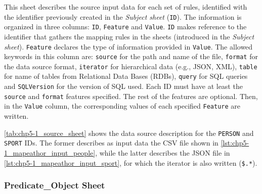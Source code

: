 This sheet describes the source input data for each set of rules, identified with the identifier previously created in the \textit{Subject sheet} (\texttt{ID}). The information is organized in three columns: \texttt{ID}, \texttt{Feature} and \texttt{Value}. 
\texttt{ID} makes reference to the identifier that gathers the mapping rules in the sheets (introduced in the \textit{Subject sheet}). 
\texttt{Feature} declares the type of information provided in \texttt{Value}. The allowed keywords in this column are: \texttt{source} for the path and name of the file, \texttt{format} for the data source format, \texttt{iterator} for hierarchical data (e.g., JSON, XML), \texttt{table} for name of tables from Relational Data Bases (RDBs), \texttt{query} for SQL queries and \texttt{SQLVersion} for the version of SQL used. Each ID must have at least the \texttt{source} and \texttt{format} features specified. The rest of the features are optional. 
Then, in the \texttt{Value} column, the corresponding values of each specified \texttt{Feature} are written. 

\cref{tab:chp5-1_source_sheet} shows the data source description for the \texttt{PERSON} and \texttt{SPORT} IDs. The former describes as input data the CSV file shown in \cref{lst:chp5-1_mapeathor_input_people}, while the latter describes the JSON file in \cref{lst:chp5-1_mapeathor_input_sport}, for which the iterator is also written (\texttt{\$.*}). 

\subsubsection{Predicate\_Object Sheet} 

\begin{table}[h!]
\caption{Predicate\_Object sheet.}
\label{tab:chp5-1_po_sheet}
\centering
{}
\end{table}


